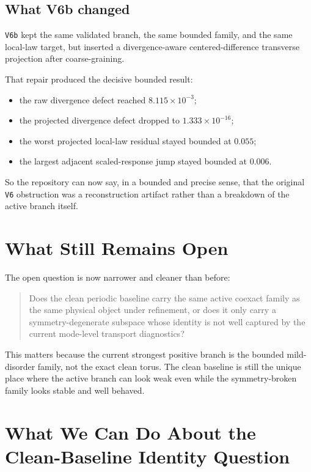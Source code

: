 \documentclass[11pt]{article}
\begin{document}
\subsection{What V6b changed}

\texttt{V6b} kept the same validated branch, the same bounded family, and the same local-law target, but inserted a divergence-aware centered-difference transverse projection after coarse-graining.

That repair produced the decisive bounded result:
\begin{itemize}
\item the raw divergence defect reached \(8.115 \times 10^{-3}\);
\item the projected divergence defect dropped to \(1.333 \times 10^{-16}\);
\item the worst projected local-law residual stayed bounded at \(0.055\);
\item the largest adjacent scaled-response jump stayed bounded at \(0.006\).
\end{itemize}

So the repository can now say, in a bounded and precise sense, that the original \texttt{V6} obstruction was a reconstruction artifact rather than a breakdown of the active branch itself.

\section{What Still Remains Open}

The open question is now narrower and cleaner than before:

\begin{quote}
Does the clean periodic baseline carry the same active coexact family as the same physical object under refinement, or does it only carry a symmetry-degenerate subspace whose identity is not well captured by the current mode-level transport diagnostics?
\end{quote}

This matters because the current strongest positive branch is the bounded mild-disorder family, not the exact clean torus. The clean baseline is still the unique place where the active branch can look weak even while the symmetry-broken family looks stable and well behaved.

\section{What We Can Do About the Clean-Baseline Identity Question}
\end{document}
